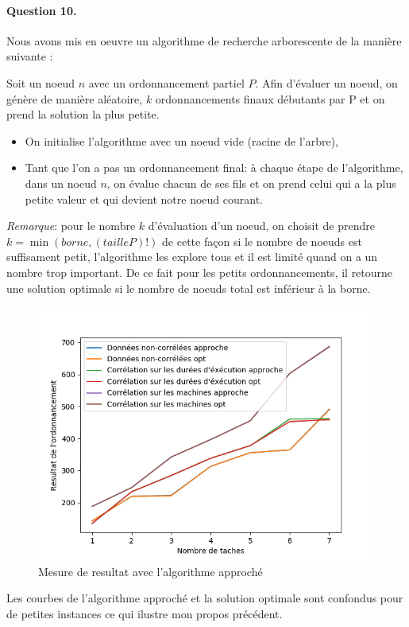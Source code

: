 \documentclass[a4paper, 10pt]{article}
\begin{document}
         \paragraph{Question 10.}{Nous avons mis en oeuvre un algorithme de recherche arborescente de la manière suivante :
         
Soit un noeud $n$ avec un ordonnancement partiel $P$. Afin d'évaluer un noeud, on génère de manière aléatoire, $k$ ordonnancements finaux débutants par P et on prend la solution la plus petite.
	\begin{itemize}
    		\item On initialise l'algorithme avec un noeud vide (racine de l'arbre),
        \item Tant que l'on a pas un ordonnancement final: à chaque étape de l'algorithme, dans un noeud $n$, on évalue chacun de ses fils et on prend celui qui a la plus petite valeur et qui devient notre noeud courant.
    \end{itemize}
    
    
        \emph{Remarque}: pour le nombre $k$ d'évaluation d'un noeud, on choisit de prendre $k = \min(borne,(taille P)!)$ de cette façon si le nombre de noeuds est suffisament petit, l'algorithme les explore tous et il est limité quand on a un nombre trop important. De ce fait pour les petits ordonnancements, il retourne une solution optimale si le nombre de noeuds total est inférieur à la borne.

        \begin{figure}[H]
		\centering
		\includegraphics[width=0.85\linewidth]{graphes/res_greed.png}
		\caption{Mesure de resultat avec l'algorithme approché}
		\label{fig:bag}
	\end{figure}
        Les courbes de l'algorithme approché et la solution optimale sont confondus pour de petites instances ce qui ilustre mon propos précédent.

}
\end{document}
